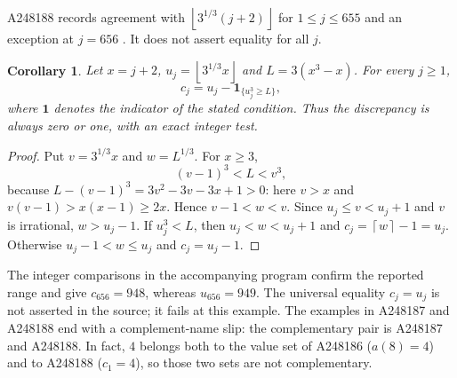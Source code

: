 \documentclass[11pt]{article}
\newtheorem{corollary}[theorem]{Corollary}
\newcommand{\floor}[1]{\left\lfloor #1\right\rfloor}
\newcommand{\ceil}[1]{\left\lceil #1\right\rceil}
\begin{document}
A248188 records agreement with $\floor{3^{1/3}(j+2)}$ for
$1\leq j\leq655$ and an exception at $j=656$ \cite{jumps,beatty}.
It does not assert equality for all $j$.

\begin{corollary}\label{cor:beatty}
Let $x=j+2$, $u_j=\floor{3^{1/3}x}$ and $L=3(x^3-x)$.
For every $j\geq1$,
\begin{equation}\label{eq:correction}
 c_j=u_j-\boldsymbol{1}_{\{u_j^3\geq L\}},
\end{equation}
where $\boldsymbol{1}$ denotes the indicator of the stated condition.
Thus the discrepancy is always zero or one, with an exact integer test.
\end{corollary}
\begin{proof}
Put $v=3^{1/3}x$ and $w=L^{1/3}$. For $x\geq3$,
\[
 (v-1)^3<L<v^3,
\]
because $L-(v-1)^3=3v^2-3v-3x+1>0$: here $v>x$ and
$v(v-1)>x(x-1)\geq2x$. Hence $v-1<w<v$.
Since $u_j\leq v<u_j+1$ and $v$ is irrational, $w>u_j-1$.
If $u_j^3<L$, then $u_j<w<u_j+1$ and $c_j=\ceil w-1=u_j$.
Otherwise $u_j-1<w\leq u_j$ and $c_j=u_j-1$.
\end{proof}

The integer comparisons in the accompanying program confirm the
reported range and give $c_{656}=948$, whereas $u_{656}=949$.
The universal equality $c_j=u_j$ is not asserted in the source;
it fails at this example. The examples in A248187 and A248188 end
with a complement-name slip: the complementary pair is A248187 and
A248188. In fact, $4$ belongs both to the value set of A248186
($a(8)=4$) and to A248188 ($c_1=4$), so those two sets are not
complementary.
\end{document}
